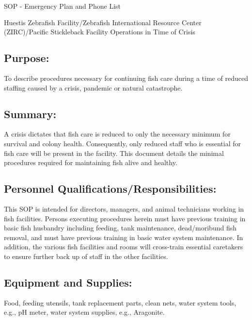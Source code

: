 \documentclass[
]{book}
\begin{document}
SOP - Emergency Plan and Phone List

Huestis Zebrafish Facility/Zebrafish International Resource Center (ZIRC)/Pacific Stickleback Facility Operations in Time of Crisis

\hypertarget{purpose-3}{%
\subsection{Purpose:}\label{purpose-3}}

To describe procedures necessary for continuing fish care during a time of reduced staffing caused by a crisis, pandemic or natural catastrophe.

\hypertarget{summary}{%
\subsection{Summary:}\label{summary}}

A crisis dictates that fish care is reduced to only the necessary minimum for survival and colony health. Consequently, only reduced staff who is essential for fish care will be present in the facility. This document details the minimal procedures required for maintaining fish alive and healthy.

\hypertarget{personnel-qualificationsresponsibilities}{%
\subsection{Personnel Qualifications/Responsibilities:}\label{personnel-qualificationsresponsibilities}}

This SOP is intended for directors, managers, and animal technicians working in fish facilities. Persons executing procedures herein must have previous training in basic fish husbandry including feeding, tank maintenance, dead/moribund fish removal, and must have previous training in basic water system maintenance. In addition, the various fish facilities and rooms will cross-train essential caretakers to ensure further back up of staff in the other facilities.

\hypertarget{equipment-and-supplies}{%
\subsection{Equipment and Supplies:}\label{equipment-and-supplies}}

Food, feeding utensils, tank replacement parts, clean nets, water system tools, e.g., pH meter, water system supplies, e.g., Aragonite.
\end{document}

